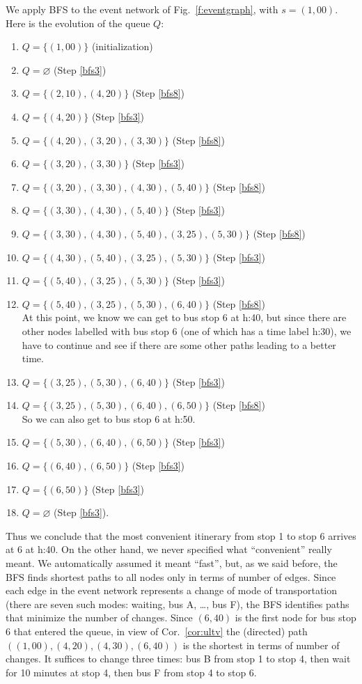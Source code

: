 \documentclass[a4paper]{book}
\theoremstyle{changebreak}                %
\begin{document}
We apply BFS to the event network of Fig.~\ref{f:eventgraph}, with
$s=(1,00)$. Here is the evolution of the queue $Q$:
\begin{enumerate}
\setlength{\parskip}{-0.2em}
\item $Q=\{(1,00)\}$ (initialization)
\item $Q=\varnothing$ (Step \ref{bfs3})
\item $Q=\{(2,10),(4,20)\}$ (Step \ref{bfs8})
\item $Q=\{(4,20)\}$ (Step \ref{bfs3})
\item $Q=\{(4,20),(3,20),(3,30)\}$ (Step \ref{bfs8})
\item $Q=\{(3,20),(3,30)\}$ (Step \ref{bfs3})
\item $Q=\{(3,20),(3,30),(4,30),(5,40)\}$ (Step \ref{bfs8})
\item $Q=\{(3,30),(4,30),(5,40)\}$ (Step \ref{bfs3})
\item $Q=\{(3,30),(4,30),(5,40),(3,25),(5,30)\}$ (Step \ref{bfs8})
\item $Q=\{(4,30),(5,40),(3,25),(5,30)\}$ (Step \ref{bfs3})
\item $Q=\{(5,40),(3,25),(5,30)\}$ (Step \ref{bfs3})
\item $Q=\{(5,40),(3,25),(5,30),(6,40)\}$ (Step \ref{bfs8}) \\ At this
  point, we know we can get to bus stop 6 at h:40, but since there are
  other nodes labelled with bus stop 6 (one of which has a time label
  h:30), we have to continue and see if there are some other paths
  leading to a better time.
\item $Q=\{(3,25),(5,30),(6,40)\}$ (Step \ref{bfs3}) 
\item $Q=\{(3,25),(5,30),(6,40),(6,50)\}$ (Step \ref{bfs8}) \\
So we can also get to bus stop 6 at h:50.
\item $Q=\{(5,30),(6,40),(6,50)\}$ (Step \ref{bfs3}) 
\item $Q=\{(6,40),(6,50)\}$ (Step \ref{bfs3}) 
\item $Q=\{(6,50)\}$ (Step \ref{bfs3}) 
\item $Q=\varnothing$ (Step \ref{bfs3}). 
\end{enumerate}
Thus we conclude that the most convenient itinerary
from stop 1 to stop 6 arrives at 6 at h:40. On the other hand, we
never specified what ``convenient'' really meant. We automatically
assumed it meant ``fast'', but, as we said before, the BFS
finds shortest paths to all nodes only in terms
of number of edges. Since each edge in the event
network represents a change of mode of
transportation (there are seven such modes:
waiting, bus A, \dots, bus F), the BFS identifies paths
that minimize the number of changes. Since $(6,40)$ is the first
node for bus stop 6 that entered the queue,
in view of Cor.~\ref{cor:ultv} the (directed)
path $((1,00),(4,20),(4,30),(6,40))$ is the
shortest in terms of number of changes. It suffices to change three
times: bus B from stop 1 to stop 4, then wait for 10 minutes at stop
4, then bus F from stop 4 to stop 6.
\end{document}

